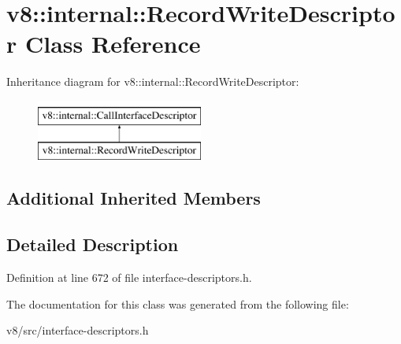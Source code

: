 \hypertarget{classv8_1_1internal_1_1RecordWriteDescriptor}{}\section{v8\+:\+:internal\+:\+:Record\+Write\+Descriptor Class Reference}
\label{classv8_1_1internal_1_1RecordWriteDescriptor}
Inheritance diagram for v8\+:\+:internal\+:\+:Record\+Write\+Descriptor\+:\begin{figure}[H]
\begin{center}
\leavevmode
\includegraphics[height=2.000000cm]{classv8_1_1internal_1_1RecordWriteDescriptor}
\end{center}
\end{figure}
\subsection*{Additional Inherited Members}


\subsection{Detailed Description}


Definition at line 672 of file interface-\/descriptors.\+h.



The documentation for this class was generated from the following file\+:\begin{DoxyCompactItemize}
\item 
v8/src/interface-\/descriptors.\+h\end{DoxyCompactItemize}
